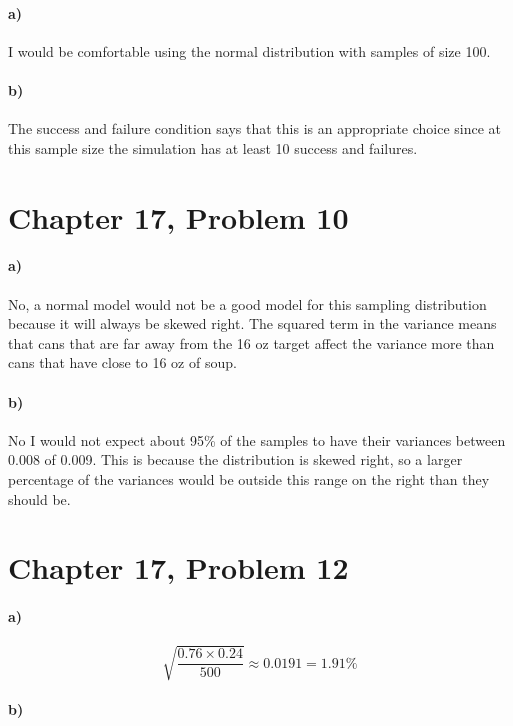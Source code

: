 \documentclass[12pt]{article}
\begin{document}
\paragraph{a)}

I would be comfortable using the normal distribution with samples of size 100.

\paragraph{b)}

The success and failure condition says that this is an appropriate choice since at this
sample size the simulation has at least 10 success and failures.

\section*{Chapter 17, Problem 10}

\paragraph{a)}

No, a normal model would not be a good model for this sampling distribution because it will
always be skewed right. The squared term in the variance means that cans that are far away
from the 16 oz target affect the variance more than cans that have close to 16 oz of soup.

\paragraph{b)}

No I would not expect about 95\% of the samples to have their variances between 0.008 of
0.009. This is because the distribution is skewed right, so a larger percentage of the variances
would be outside this range on the right than they should be.

\section*{Chapter 17, Problem 12}

\paragraph{a)}

\[\sqrt{\frac{0.76\times0.24}{500}}\approx 0.0191 = 1.91\%\]

\paragraph{b)}
\end{document}
